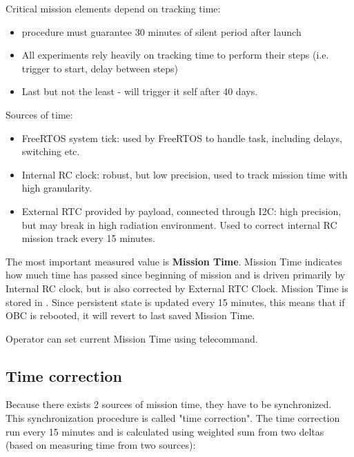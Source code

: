 
\newcommand{\deltaMcu}{\Delta t_{\mu C}}
\newcommand{\deltaRtc}{\Delta t_{RTC}}
\newcommand{\wMcu}{w_{\mu C}}
\newcommand{\wRtc}{w_{RTC}}
\newcommand{\correctionValue}{\Delta t}

Critical mission elements depend on tracking time:
\begin{itemize}
	\item {} procedure must guarantee 30 minutes of silent period after launch
	\item All experiments rely heavily on tracking time to perform their steps (i.e. trigger to start, delay between steps)
	\item Last but not the least -  will trigger it self after 40 days.
\end{itemize}

Sources of time:
\begin{itemize}
	\item FreeRTOS system tick:  used by FreeRTOS to handle task, including delays, switching etc.
	\item Internal RC clock: robust, but low precision, used to track mission time with high granularity.
	\item External RTC provided by payload, connected through I2C: high precision, but may break in high radiation environment. Used to correct internal RC mission track every 15 minutes.
\end{itemize}

The most important measured value is \textbf{Mission Time}. Mission Time indicates how much time has passed since beginning of mission and is driven primarily by Internal RC clock, but is also corrected by External RTC Clock. Mission Time is stored in . Since persistent state is updated every 15 minutes, this means that if OBC is rebooted, it will revert to last saved Mission Time.

Operator can set current Mission Time using  telecommand.

\subsection{Time correction}\label{obc:proc:time-correction}

Because there exists 2 sources of mission time, they have to be synchronized. This synchronization procedure is called "time correction". The time correction run every 15 minutes and is calculated using weighted sum from two deltas (based on measuring time from two sources):

